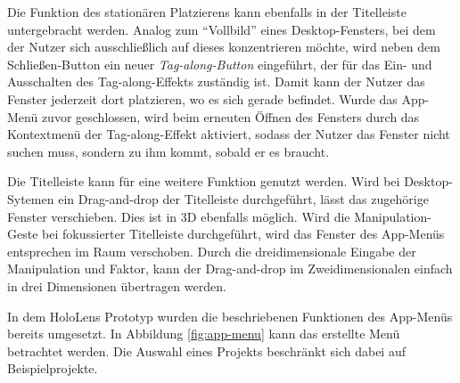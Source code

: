 Die Funktion des stationären Platzierens kann ebenfalls in der Titelleiste untergebracht werden. Analog zum "`Vollbild"' eines Desktop-Fensters, bei dem der Nutzer sich ausschließlich auf dieses konzentrieren möchte, wird neben dem Schließen-Button ein neuer \textit{Tag-along-Button} eingeführt, der für das Ein- und Ausschalten des Tag-along-Effekts zuständig ist. Damit kann der Nutzer das Fenster jederzeit dort platzieren, wo es sich gerade befindet. Wurde das App-Menü zuvor geschlossen, wird beim erneuten Öffnen des Fensters durch das Kontextmenü der Tag-along-Effekt aktiviert, sodass der Nutzer das Fenster nicht suchen muss, sondern zu ihm kommt, sobald er es braucht.

Die Titelleiste kann für eine weitere Funktion genutzt werden. Wird bei Desktop-Sytemen ein Drag-and-drop der Titelleiste durchgeführt, lässt das zugehörige Fenster verschieben. Dies ist in 3D ebenfalls möglich. Wird die Manipulation-Geste bei fokussierter Titelleiste durchgeführt, wird das Fenster des App-Menüs entsprechen im Raum verschoben. Durch die dreidimensionale Eingabe der Manipulation und Faktor, kann der Drag-and-drop im Zweidimensionalen einfach in drei Dimensionen übertragen werden.

In dem HoloLens Prototyp wurden die beschriebenen Funktionen des App-Menüs bereits umgesetzt. In Abbildung \ref{fig:app-menu} kann das erstellte Menü betrachtet werden. Die Auswahl eines Projekts beschränkt sich dabei auf Beispielprojekte.


